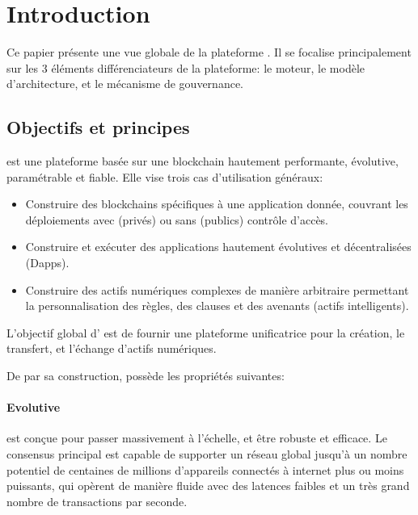 \documentclass[runningheads]{llncs}
\begin{document}
\section{Introduction}
\label{section:introduction}
Ce papier présente une vue globale de la plateforme \AVAPlatformName{}. Il se focalise principalement sur les 3 éléments
différenciateurs de la plateforme: le moteur, le modèle d'architecture, et le mécanisme de gouvernance.

\subsection{\AVAPlatformName{} Objectifs et principes}
\AVAPlatformName{} est une plateforme basée sur une blockchain hautement performante, évolutive, paramétrable et fiable.
Elle vise trois cas d'utilisation généraux:
\begin{itemize}
\item Construire des blockchains spécifiques à une application donnée, couvrant les déploiements avec (privés) ou sans
  (publics) contrôle d'accès.
\item Construire et exécuter des applications hautement évolutives et décentralisées (Dapps).
\item Construire des actifs numériques complexes de manière arbitraire permettant la personnalisation des règles,
  des clauses et des avenants (actifs intelligents).
\end{itemize}
L'objectif global d'\AVAPlatformName{} est de fournir une plateforme unificatrice pour la création, le transfert, et
l'échange d'actifs numériques.

\noindent De par sa construction, \AVAPlatformName{} possède les propriétés suivantes:

\paragraph{Evolutive} \AVAPlatformName{} est conçue pour passer massivement à l'échelle, et être robuste et efficace.
Le consensus principal est capable de supporter un réseau global jusqu'à un nombre potentiel de centaines de millions
d'appareils connectés à internet plus ou moins puissants, qui opèrent de manière fluide avec des latences faibles et un
très grand nombre de transactions par seconde.
\end{document}
